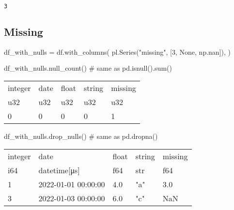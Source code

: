 \documentclass[
  letterpaper,
  DIV=11,
  numbers=noendperiod]{scrartcl}
\newenvironment{Shaded}{\begin{snugshade}}{\end{snugshade}}
\newcommand{\CommentTok}[1]{\textcolor[rgb]{0.37,0.37,0.37}{#1}}
\newcommand{\DecValTok}[1]{\textcolor[rgb]{0.68,0.00,0.00}{#1}}
\newcommand{\NormalTok}[1]{\textcolor[rgb]{0.00,0.23,0.31}{#1}}
\newcommand{\OperatorTok}[1]{\textcolor[rgb]{0.37,0.37,0.37}{#1}}
\newcommand{\StringTok}[1]{\textcolor[rgb]{0.13,0.47,0.30}{#1}}
\newcommand{\VariableTok}[1]{\textcolor[rgb]{0.07,0.07,0.07}{#1}}
\begin{document}
\begin{verbatim}
3
\end{verbatim}

\hypertarget{missing-1}{%
\subsection{Missing}\label{missing-1}}

\begin{Shaded}
\begin{Highlighting}[]
\NormalTok{df\_with\_nulls }\OperatorTok{=}\NormalTok{ df.with\_columns(}
\NormalTok{    pl.Series(}\StringTok{"missing"}\NormalTok{, [}\DecValTok{3}\NormalTok{, }\VariableTok{None}\NormalTok{, np.nan]),}
\NormalTok{)}
\end{Highlighting}
\end{Shaded}

\begin{Shaded}
\begin{Highlighting}[]
\NormalTok{df\_with\_nulls.null\_count() }\CommentTok{\# same as pd.isnull().sum()}
\end{Highlighting}
\end{Shaded}

\begin{longtable}[]{@{}lllll@{}}
\toprule()
integer & date & float & string & missing \\
u32 & u32 & u32 & u32 & u32 \\
\midrule()
\endhead
0 & 0 & 0 & 0 & 1 \\
\bottomrule()
\end{longtable}

\begin{Shaded}
\begin{Highlighting}[]
\NormalTok{df\_with\_nulls.drop\_nulls() }\CommentTok{\# same as pd.dropna()}
\end{Highlighting}
\end{Shaded}

\begin{longtable}[]{@{}lllll@{}}
\toprule()
integer & date & float & string & missing \\
i64 & datetime{[}μs{]} & f64 & str & f64 \\
\midrule()
\endhead
1 & 2022-01-01 00:00:00 & 4.0 & "a" & 3.0 \\
3 & 2022-01-03 00:00:00 & 6.0 & "c" & NaN \\
\bottomrule()
\end{longtable}
\end{document}
